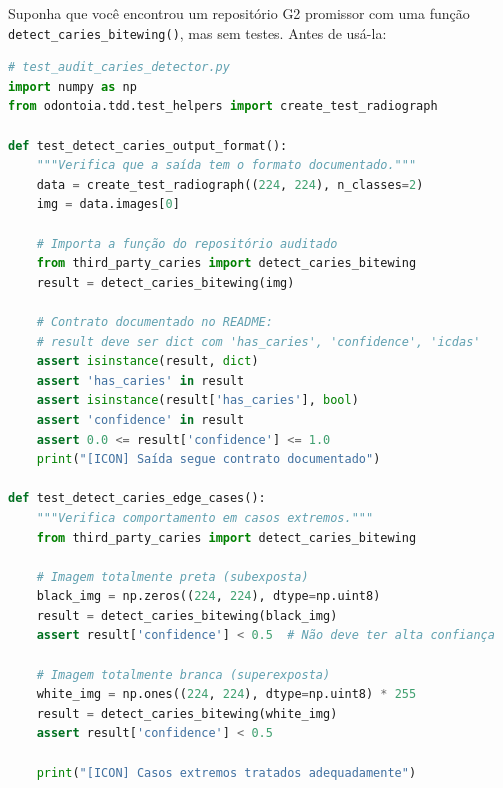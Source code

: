Suponha que você encontrou um repositório G2 promissor com uma função
\texttt{detect\_caries\_bitewing()}, mas sem testes. Antes de usá-la:

\begin{lstlisting}[language=Python, caption=TDD sobre código de terceiros — etapa RED]
# test_audit_caries_detector.py
import numpy as np
from odontoia.tdd.test_helpers import create_test_radiograph

def test_detect_caries_output_format():
    """Verifica que a saída tem o formato documentado."""
    data = create_test_radiograph((224, 224), n_classes=2)
    img = data.images[0]

    # Importa a função do repositório auditado
    from third_party_caries import detect_caries_bitewing
    result = detect_caries_bitewing(img)

    # Contrato documentado no README:
    # result deve ser dict com 'has_caries', 'confidence', 'icdas'
    assert isinstance(result, dict)
    assert 'has_caries' in result
    assert isinstance(result['has_caries'], bool)
    assert 'confidence' in result
    assert 0.0 <= result['confidence'] <= 1.0
    print("[ICON] Saída segue contrato documentado")

def test_detect_caries_edge_cases():
    """Verifica comportamento em casos extremos."""
    from third_party_caries import detect_caries_bitewing

    # Imagem totalmente preta (subexposta)
    black_img = np.zeros((224, 224), dtype=np.uint8)
    result = detect_caries_bitewing(black_img)
    assert result['confidence'] < 0.5  # Não deve ter alta confiança

    # Imagem totalmente branca (superexposta)
    white_img = np.ones((224, 224), dtype=np.uint8) * 255
    result = detect_caries_bitewing(white_img)
    assert result['confidence'] < 0.5

    print("[ICON] Casos extremos tratados adequadamente")
\end{lstlisting}



